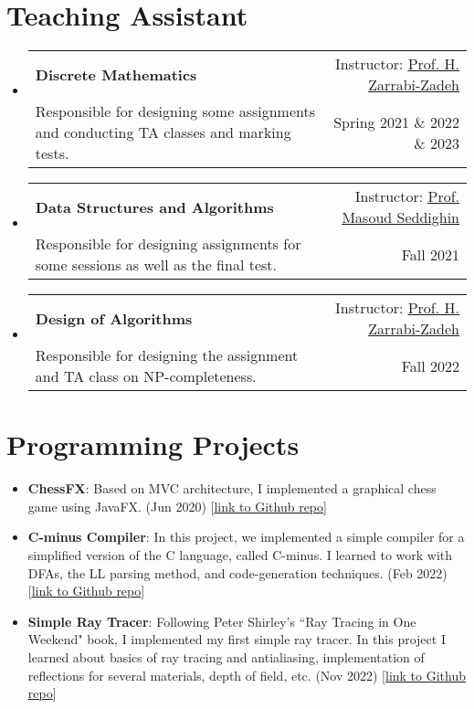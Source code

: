 \documentclass[letterpaper,10.8pt]{article}
\makeatletter
\newcommand{\Href}[2]{\href{#1}{\underline{#2}}}
\newcommand{\resumeItem}[2]{
  \item\small{
    \textbf{#1}{: #2 \vspace{-2pt}}
  }
}
\newcommand{\resumeSubheading}[4]{
  \vspace{-1pt}\item
    \begin{tabular*}{0.97\textwidth}{l@{\extracolsep{\fill}}r}
      \textbf{#1} & #2 \\
      {\small#3} & {\small #4} \\
    \end{tabular*}\vspace{-5pt}
}
\newcommand{\resumeSubHeadingListStart}{\begin{itemize}[leftmargin=*]}
\newcommand{\resumeSubHeadingListEnd}{\end{itemize}}
\makeatother
\begin{document}
\section{Teaching Assistant}

  \resumeSubHeadingListStart
    \resumeSubheading
      {Discrete Mathematics}{Instructor: \Href{http://sharif.edu/~zarrabi/}{Prof. H. Zarrabi-Zadeh}}
      {Responsible for designing some assignments and conducting TA classes and marking tests.}{Spring 2021 \& 2022 \& 2023}

    \resumeSubheading
      {Data Structures and Algorithms}{Instructor: \Href{https://people.mpi-inf.mpg.de/~mseddigh/}{Prof. Masoud Seddighin}}
      {Responsible for designing assignments for some sessions as well as the final test.}{Fall 2021}

    \resumeSubheading
      {Design of Algorithms}{Instructor: \Href{http://sharif.edu/~zarrabi/}{Prof. H. Zarrabi-Zadeh}}
      {Responsible for designing the assignment and TA class on NP-completeness.}{Fall 2022}

  \resumeSubHeadingListEnd


\section{Programming Projects}
\resumeSubHeadingListStart


\resumeItem{ChessFX}{Based on MVC architecture, I implemented a graphical chess game using JavaFX. (Jun 2020) [\Href{https://github.com/mahdavifar2002/ChessFX}{link to Github repo}]}

\resumeItem{C-minus Compiler}{In this project, we implemented a simple compiler for a simplified version of the C language, called C-minus. I learned to work with DFAs, the LL parsing method, and code-generation techniques. (Feb 2022) [\Href{https://github.com/AlipourIm/Compiler_Design_And_Implementation_Project}{link to Github repo}]}

\resumeItem{Simple Ray Tracer}{Following Peter Shirley's ``Ray Tracing in One Weekend" book, I implemented my first simple ray tracer. In this project I learned about basics of ray tracing and  antialiasing, implementation of reflections for several materials, depth of field, etc. (Nov 2022) [\Href{https://github.com/mahdavifar2002/ray-tracing-in-one-weekend/}{link to Github repo}]}


\resumeSubHeadingListEnd
\end{document}
